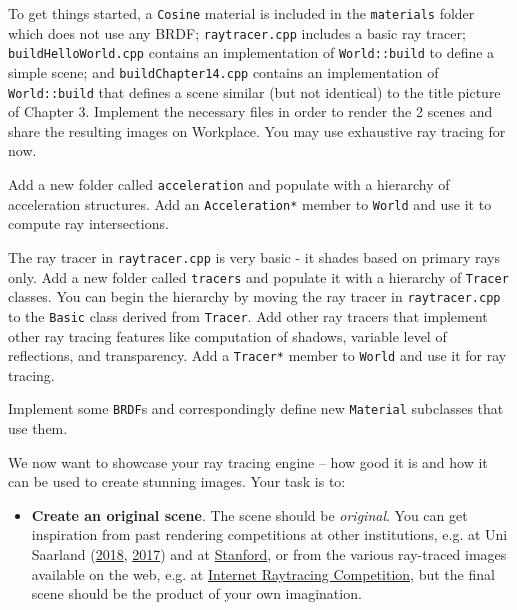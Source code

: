 \documentclass[addpoints]{exam}
\begin{document}
\begin{questions}
  
  To get things started, a \texttt{Cosine} material is included in the \texttt{materials} folder which does not use any BRDF; \texttt{raytracer.cpp} includes a basic ray tracer; \texttt{buildHelloWorld.cpp} contains an implementation of \texttt{World::build} to define a simple scene; and \texttt{buildChapter14.cpp} contains an implementation of \texttt{World::build} that defines a scene similar (but not identical) to the title picture of Chapter 3.
  Implement the necessary files in order to render the 2 scenes and share the resulting images on Workplace. You may use exhaustive ray tracing for now.

  Add a new folder called \texttt{acceleration} and populate with a hierarchy of acceleration structures. Add an \texttt{Acceleration*} member to \texttt{World} and use it to compute ray intersections.

  The ray tracer in \texttt{raytracer.cpp} is very basic - it shades based on primary rays only. Add a new folder called \texttt{tracers} and populate it with a hierarchy of \texttt{Tracer} classes. You can begin the hierarchy by moving the ray tracer in \texttt{raytracer.cpp} to the \texttt{Basic} class derived from \texttt{Tracer}. Add other ray tracers that implement other ray tracing features like computation of shadows, variable level of reflections, and transparency. Add a \texttt{Tracer*} member to \texttt{World} and use it for ray tracing.
  
  Implement some \texttt{BRDF}s and correspondingly define new \texttt{Material} subclasses that use them.

  \newpage
  We now want to showcase your ray tracing engine -- how good it is and how it can be used to create stunning images. Your task is to:
  \begin{itemize}
  \item \textbf{Create an original scene}. The scene should be \emph{original}. You can get inspiration from past rendering competitions at other institutions, e.g. at Uni Saarland (\href{https://graphics.cg.uni-saarland.de/courses/cg1-2018/#rendering-competition}{2018}, \href{https://graphics.cg.uni-saarland.de/courses/cg1-2017/#rendering-competition}{2017}) and at \href{https://graphics.stanford.edu/courses/cs348b-competition/}{Stanford}, or from the various ray-traced images available on the web, e.g. at \href{http://www.irtc.org/stills/}{Internet Raytracing Competition}, but the final scene should be the product of your own imagination.
  

\end{itemize}
\end{questions}
\end{document}
